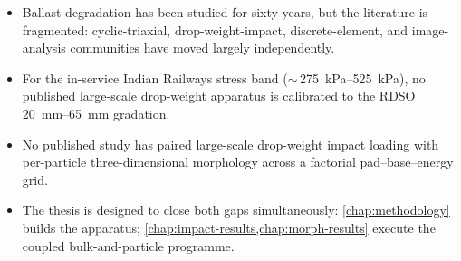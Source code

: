 \begin{chaptertakeaways}
\begin{itemize}[leftmargin=*,itemsep=2pt,topsep=2pt]
    \item Ballast degradation has been studied for sixty years, but
          the literature is fragmented: cyclic-triaxial,
          drop-weight-impact, discrete-element, and image-analysis
          communities have moved largely independently.
    \item For the in-service Indian Railways stress band
          ($\sim$\,\SIrange{275}{525}{\kilo\pascal}), no published
          large-scale drop-weight apparatus is calibrated to the
          \gls{RDSO} \SIrange{20}{65}{\milli\metre} gradation.
    \item No published study has paired large-scale drop-weight
          impact loading with per-particle three-dimensional
          morphology across a factorial pad--base--energy grid.
    \item The thesis is designed to close both gaps simultaneously:
          \cref{chap:methodology} builds the apparatus;
          \cref{chap:impact-results,chap:morph-results} execute the
          coupled bulk-and-particle programme.
\end{itemize}
\end{chaptertakeaways}
